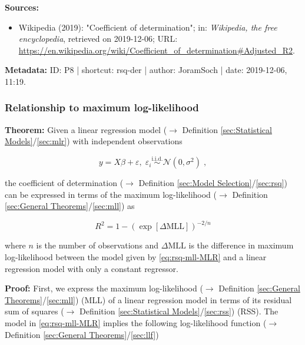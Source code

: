 \documentclass[a4paper,12pt,twoside]{book}
\begin{document}
\vspace{1em}
\textbf{Sources:}
\begin{itemize}
\item Wikipedia (2019): "Coefficient of determination"; in: \textit{Wikipedia, the free encyclopedia}, retrieved on 2019-12-06; URL: \url{https://en.wikipedia.org/wiki/Coefficient_of_determination#Adjusted_R2}.
\end{itemize}


\vspace{1em}
\textbf{Metadata:} ID: P8 | shortcut: rsq-der | author: JoramSoch | date: 2019-12-06, 11:19.
\vspace{1em}



\subsubsection[\textbf{Relationship to maximum log-likelihood}]{Relationship to maximum log-likelihood} \label{sec:rsq-mll}
\setcounter{equation}{0}

\textbf{Theorem:} Given a linear regression model ($\rightarrow$ Definition \ref{sec:Statistical Models}/\ref{sec:mlr}) with independent observations

\begin{equation} \label{eq:rsq-mll-MLR}
y = X\beta + \varepsilon, \; \varepsilon_i \overset{\mathrm{i.i.d.}}{\sim} \mathcal{N}(0, \sigma^2) \; ,
\end{equation}

the coefficient of determination ($\rightarrow$ Definition \ref{sec:Model Selection}/\ref{sec:rsq}) can be expressed in terms of the maximum log-likelihood ($\rightarrow$ Definition \ref{sec:General Theorems}/\ref{sec:mll}) as

\begin{equation} \label{eq:rsq-mll-R2-MLL}
R^2 = 1 - \left( \exp[\Delta\mathrm{MLL}] \right)^{-2/n}
\end{equation}

where $n$ is the number of observations and $\Delta\mathrm{MLL}$ is the difference in maximum log-likelihood between the model given by \eqref{eq:rsq-mll-MLR} and a linear regression model with only a constant regressor.


\vspace{1em}
\textbf{Proof:} First, we express the maximum log-likelihood ($\rightarrow$ Definition \ref{sec:General Theorems}/\ref{sec:mll}) (MLL) of a linear regression model in terms of its residual sum of squares ($\rightarrow$ Definition \ref{sec:Statistical Models}/\ref{sec:rss}) (RSS). The model in \eqref{eq:rsq-mll-MLR} implies the following log-likelihood function ($\rightarrow$ Definition \ref{sec:General Theorems}/\ref{sec:llf})
\end{document}

